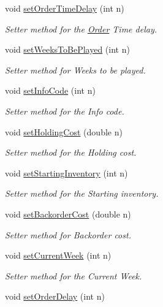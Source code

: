 \begin{DoxyCompactItemize}
void \hyperlink{class_game_af127a9a8e81e7863d6cb73025181a62b}{set\+Order\+Time\+Delay} (int n)
\begin{DoxyCompactList}\small\item\em Setter method for the \hyperlink{class_order}{Order} Time delay. \end{DoxyCompactList}\item 
void \hyperlink{class_game_abae5ec4f77327efde1516e8bd1edda2b}{set\+Weeks\+To\+Be\+Played} (int n)
\begin{DoxyCompactList}\small\item\em Setter method for Weeks to be played. \end{DoxyCompactList}\item 
void \hyperlink{class_game_a8da75fddaf91545459de45a52f604ebb}{set\+Info\+Code} (int n)
\begin{DoxyCompactList}\small\item\em Setter method for the Info code. \end{DoxyCompactList}\item 
void \hyperlink{class_game_a5136cc3fd07b605ed6df658024eb1e88}{set\+Holding\+Cost} (double n)
\begin{DoxyCompactList}\small\item\em Setter method for the Holding cost. \end{DoxyCompactList}\item 
void \hyperlink{class_game_aa994becb6fe955b2ed8dad3a24a57937}{set\+Starting\+Inventory} (int n)
\begin{DoxyCompactList}\small\item\em Setter method for the Starting inventory. \end{DoxyCompactList}\item 
void \hyperlink{class_game_a6526b895b01b619358918e5276314f43}{set\+Backorder\+Cost} (double n)
\begin{DoxyCompactList}\small\item\em Setter method for Backorder cost. \end{DoxyCompactList}\item 
void \hyperlink{class_game_a5d7966304ef0340bc9c1586bcee55738}{set\+Current\+Week} (int n)
\begin{DoxyCompactList}\small\item\em Setter method for the Current Week. \end{DoxyCompactList}\item 
void \hyperlink{class_game_adf895b54f74b8d95c4f67b15cef75290}{set\+Order\+Delay} (int n)

\end{DoxyCompactItemize}
